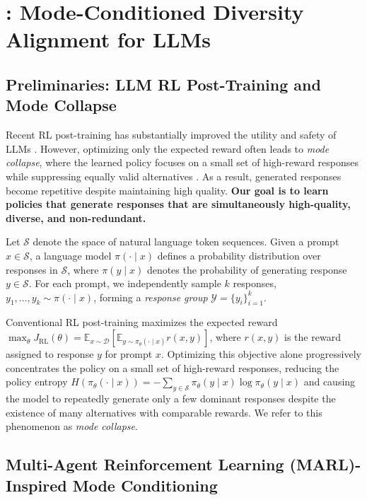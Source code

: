 \section{\methodcolor: Mode-Conditioned Diversity Alignment for LLMs}
\label{sec:method}

\subsection{Preliminaries: LLM RL Post-Training and Mode Collapse}
\label{ssec:preliminaries}

Recent RL post-training has substantially improved the utility and safety of LLMs \citep{shao2024deepseekmath,Guo_2025}. However, optimizing only the expected reward often leads to \emph{mode collapse}, where the learned policy focuses on a small set of high-reward responses while suppressing equally valid alternatives \citep{kirk2024understandingeffectsrlhfllm}. As a result, generated responses become repetitive despite maintaining high quality. \textbf{Our goal is to learn policies that generate responses that are simultaneously high-quality, diverse, and non-redundant.}

Let $\mathcal{S}$ denote the space of natural language token sequences. Given a prompt $x \in \mathcal{S}$, a language model $\pi(\cdot \mid x)$ defines a probability distribution over responses in $\mathcal{S}$, where $\pi(y \mid x)$ denotes the probability of generating response $y \in \mathcal{S}$. For each prompt, we independently sample $k$ responses, $y_1, \ldots, y_k \sim \pi(\cdot \mid x)$, forming a \emph{response group} $\mathcal{Y}=\{y_i\}_{i=1}^{k}$.

Conventional RL post-training maximizes the expected reward $\max_{\theta} J_{\mathrm{RL}}(\theta) = \mathbb{E}_{x \sim \mathcal{D}}\left[\mathbb{E}_{y \sim \pi_{\theta}(\cdot \mid x)} r(x,y)\right]$, where $r(x,y)$ is the reward assigned to response $y$ for prompt $x$. Optimizing this objective alone progressively concentrates the policy on a small set of high-reward responses, reducing the policy entropy $H(\pi_{\theta}(\cdot \mid x)) = -\sum_{y \in \mathcal{S}} \pi_{\theta}(y \mid x) \log \pi_{\theta}(y \mid x)$ and causing the model to repeatedly generate only a few dominant responses despite the existence of many alternatives with comparable rewards. We refer to this phenomenon as \emph{mode collapse}.


\subsection{Multi-Agent Reinforcement Learning (MARL)-Inspired Mode Conditioning}

